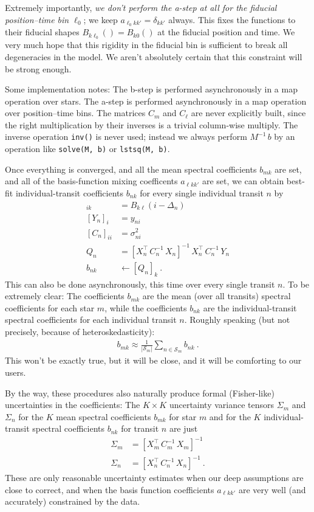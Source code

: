 \documentclass{article}
\newcommand{\set}[1]{\mathscr{#1}}
\begin{document}
Extremely importantly, \emph{we don't perform the a-step at all for the fiducial position--time bin $\ell_0$};
we keep $a_{\ell_0 kk'}=\delta_{kk'}$ always.
This fixes the functions to their fiducial shapes $B_{k\ell_0}()=B_{k0}()$ at the fiducial position and time.
We very much hope that this rigidity in the fiducial bin is sufficient to break all degeneracies in the model.
We aren't absolutely certain that this constraint will be strong enough.

Some implementation notes:
The b-step is performed asynchronously in a map operation over stars.
The a-step is performed asynchronously in a map operation over position--time bins.
The matrices $C_m$ and $C_\ell$ are never explicitly built, since the right multiplication by their inverses is a trivial column-wise multiply.
The inverse operation \texttt{inv()} is never used; instead we always perform $M^{-1}\,b$ by an operation like \texttt{solve(M, b)} or \texttt{lstsq(M, b)}.

Once everything is converged, and all the mean spectral coefficients $b_{mk}$ are set,
and all of the basis-function mixing coefficents $a_{\ell kk'}$ are set,
we can obtain best-fit individual-transit coefficients $b_{nk}$ for every single individual transit $n$ by
\begin{align}
    [X_n]_{ik} &= B_{k\ell}(i-\Delta_n) \\
    [Y_n]_i &= y_{ni} \\
    [C_n]_{ii} &= \sigma^2_{ni} \\
    Q_n &= [X_n^\top\,C^{-1}_n\,X_n]^{-1}\,X_n^\top\,C^{-1}_n\,Y_n \\
    b_{nk} &\leftarrow [Q_n]_{k} ~.
\end{align}
This can also be done asynchronously, this time over every single transit $n$.
To be extremely clear: The coefficients $b_{mk}$ are the mean (over all transits) spectral coefficients for each star $m$,
while the coefficients $b_{nk}$ are the individual-transit spectral coefficients for each individual transit $n$.
Roughly speaking (but not precisely, because of heteroskedasticity):
\begin{align}
    b_{mk} \approx \frac{1}{|\set{S}_m|}\sum_{n\in\set{S}_m} b_{nk} ~.
\end{align}
This won't be exactly true, but it will be close, and it will be comforting to our users.

By the way, these procedures also naturally produce formal (Fisher-like) uncertainties in the coefficients:
The $K\times K$ uncertainty variance tensors $\Sigma_m$ and $\Sigma_n$ for the $K$ mean spectral coefficients $b_{mk}$ for star $m$ and for the $K$ individual-transit spectral coefficients $b_{nk}$ for transit $n$ are just
\begin{align}
    \Sigma_m &= [X_m^\top\,C^{-1}_m\,X_m]^{-1} \\
    \Sigma_n &= [X_n^\top\,C^{-1}_n\,X_n]^{-1} ~.
\end{align}
These are only reasonable uncertainty estimates when our deep assumptions are close to correct, and when the basis function coefficients $a_{\ell kk'}$ are very well (and accurately) constrained by the data.
\end{document}

